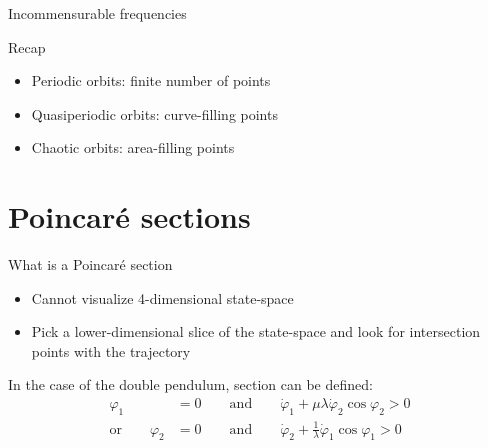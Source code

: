 \documentclass{beamer}
\begin{document}
\begin{frame}{Incommensurable frequencies}
    \centering
\end{frame}

\begin{frame}{Recap}
\begin{itemize}
    \setlength\itemsep{\fill}
    \item Periodic orbits: finite number of points
    \item Quasiperiodic orbits: curve-filling points
    \item Chaotic orbits: area-filling points
\end{itemize}  
\end{frame}


\section{Poincaré sections}



\begin{frame}{What is a Poincaré section}
    \begin{itemize}
        \item Cannot visualize 4-dimensional state-space
        \item Pick a lower-dimensional slice of the state-space and look for intersection points with the trajectory
    \end{itemize}
    \pause
    
    \vspace{10mm}
    In the case of the double pendulum, section can be defined:
    \begin{align*}
        \varphi_1 &= 0 \qquad \text{and} \qquad \dot \varphi_1 + \mu \lambda \dot \varphi_2 \cos{\varphi_2} > 0\\
        \text{or}\qquad \varphi_2 &= 0 \qquad \text{and} \qquad \dot \varphi_2 + \frac{1}{\lambda} \dot \varphi_1 \cos{\varphi_1} > 0
    \end{align*}
\end{frame}
\end{document}
